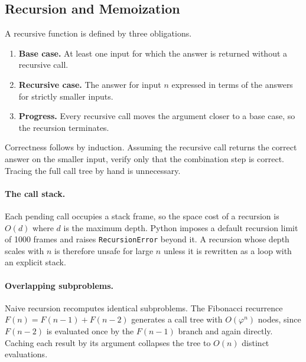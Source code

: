 \subsection{Recursion and Memoization}

A recursive function is defined by three obligations.

\begin{keybox}
\begin{enumerate}[itemsep=1ex]
  \item \textbf{Base case.} At least one input for which the answer is
        returned without a recursive call.
  \item \textbf{Recursive case.} The answer for input $n$ expressed in terms
        of the answers for strictly smaller inputs.
  \item \textbf{Progress.} Every recursive call moves the argument closer to a
        base case, so the recursion terminates.
\end{enumerate}

\medskip

Correctness follows by induction. Assuming the recursive call returns the
correct answer on the smaller input, verify only that the combination step is
correct. Tracing the full call tree by hand is unnecessary.
\end{keybox}

\paragraph{The call stack.} Each pending call occupies a stack frame, so the
space cost of a recursion is $O(d)$ where $d$ is the maximum depth. Python
imposes a default recursion limit of 1000 frames and raises
\texttt{RecursionError} beyond it. A recursion whose depth scales with $n$ is
therefore unsafe for large $n$ unless it is rewritten as a loop with an
explicit stack.

\paragraph{Overlapping subproblems.} Naive recursion recomputes identical
subproblems. The Fibonacci recurrence $F(n) = F(n-1) + F(n-2)$ generates a
call tree with $O(\varphi^n)$ nodes, since $F(n-2)$ is evaluated once by the
$F(n-1)$ branch and again directly. Caching each result by its argument
collapses the tree to $O(n)$ distinct evaluations.

